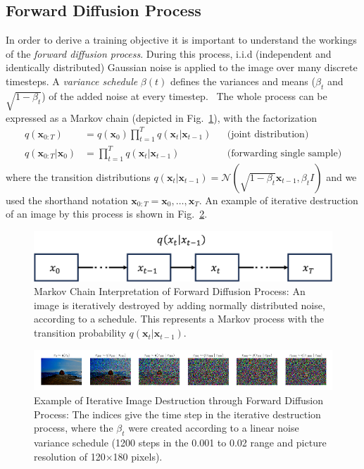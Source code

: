 \subsection{Forward Diffusion Process}
\label{sec:forwarddiffusion}
In order to derive a training objective it is important to understand the workings of the \textit{forward diffusion process}. During this process, i.i.d (independent and identically distributed) Gaussian noise is applied to the image over many discrete timesteps. A \textit{variance schedule} $\beta(t)$ defines the variances and means ($\beta_t$ and $\sqrt{1-\beta_t}$) of the added noise at every timestep.~\autocite{ho2020denoising} The whole process can be expressed as a Markov chain (depicted in Fig.~\ref{fig:forward_diffusion}), with the factorization
\begin{align}
    \label{eq:forwardprocess}
    q(\bm{x}_{0:T})            & = q(\bm{x}_0) \prod_{t=1}^{T} q(\bm{x}_{t}|\bm{x}_{t-1}) &  & \text{(joint distribution)}       \\
    q(\bm{x}_{0:T}|\bm{x}_{0}) & = \prod_{t=1}^{T} q(\bm{x}_{t}|\bm{x}_{t-1})             &  & \text{(forwarding single sample)}
\end{align}
where the transition distributions $q(\bm{x}_t|\bm{x}_{t-1}) = \mathcal{N}(\sqrt{1-\beta_t} \bm{x}_{t-1}, \beta_t I)$ and we used the shorthand notation $\bm{x}_{0:T} = \bm{x}_{0},\dots,\bm{x}_{T}$. An example of iterative destruction of an image by this process is shown in Fig.~\ref{fig:forward_naoshima}.

\begin{figure}[h]
    \centering
    \includegraphics[width=.5\textwidth]{images/forward_diffusion.png}
    \caption[Markov Chain Interpretation of Forward Diffusion Process]{Markov Chain Interpretation of Forward Diffusion Process: An image is iteratively destroyed by adding normally distributed noise,
        according to a schedule. This represents a Markov process with the transition probability $q(\bm{x}_t|\bm{x}_{t-1})$.}
    \label{fig:forward_diffusion}
\end{figure}

\begin{figure}[h]
    \centering
    \includegraphics[width=\textwidth]{images/forward_naoshima_clean.png}
    \caption[Example of Iterative Image Destruction through Forward Diffusion Process]{Example of Iterative Image Destruction through Forward Diffusion Process:
        The indices give the time step in the iterative destruction process, where the $\beta_t$ were created according to a linear noise variance schedule (1200 steps in the 0.001 to 0.02 range and picture resolution of 120$\times$180 pixels).}
    \label{fig:forward_naoshima}
\end{figure}

